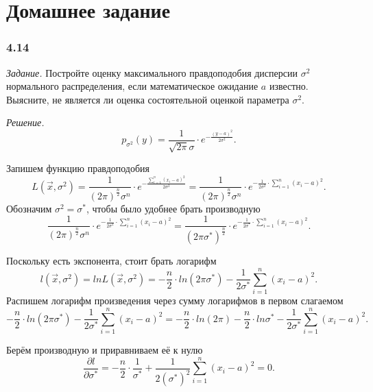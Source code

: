 \section*{Домашнее задание}

\subsubsection*{4.14}

\textit{Задание.}
Постройте оценку максимального правдоподобия дисперсии $ \sigma^2$ нормального распределения,
если математическое ожидание $a$ известно.
Выясните, не является ли оценка состоятельной оценкой параметра $ \sigma^2$.

\textit{Решение.}
$$p_{ \sigma^2} \left( y \right) =
  \frac{1}{ \sqrt{2 \pi } \sigma } \cdot e^{- \frac{ \left( y - a \right)^2}{2 \sigma^2}}.$$

Запишем функцию правдоподобия
$$L \left( \vec{x}, \sigma^2 \right) =
  \frac{1}{ \left( 2 \pi \right)^{ \frac{n}{2}} \sigma^n} \cdot
  e^{- \frac{ \sum \limits_{i = 1}^n \left( x_i - a \right)^2}{2 \sigma^2}} =
  \frac{1}{ \left( 2 \pi \right)^{ \frac{n}{2}} \sigma^n} \cdot
  e^{- \frac{1}{2 \sigma^2} \cdot \sum \limits_{i = 1}^n \left( x_i - a \right)^2}.$$
Обозначим $ \sigma^2 = \sigma^*$, чтобы было удобнее брать производную
$$ \frac{1}{ \left( 2 \pi \right)^{ \frac{n}{2}} \sigma^n} \cdot
  e^{- \frac{1}{2 \sigma^2} \cdot \sum \limits_{i = 1}^n \left( x_i - a \right)^2} =
  \frac{1}{ \left( 2 \pi \sigma^* \right)^{ \frac{n}{2}}} \cdot
  e^{- \frac{1}{2 \sigma^*} \cdot \sum \limits_{i = 1}^n \left( x_i - a \right)^2}.$$

Поскольку есть экспонента, стоит брать логарифм
$$l \left( \vec{x}, \sigma^2 \right) =
  ln L \left( \vec{x}, \sigma^2 \right) =
  - \frac{n}{2} \cdot ln \left( 2 \pi \sigma^* \right) -
  \frac{1}{2 \sigma^*} \sum \limits_{i = 1}^n \left( x_i - a \right)^2.$$
Распишем логарифм произведения через сумму логарифмов в первом слагаемом
$$- \frac{n}{2} \cdot ln \left( 2 \pi \sigma^* \right) -
  \frac{1}{2 \sigma^*} \sum \limits_{i = 1}^n \left( x_i - a \right)^2 =
  - \frac{n}{2} \cdot ln \left( 2 \pi \right) -
  \frac{n}{2} \cdot ln \sigma^* -
  \frac{1}{2 \sigma^*} \sum \limits_{i = 1}^n \left( x_i - a \right)^2.$$

Берём производную и приравниваем её к нулю
$$ \frac{ \partial l}{ \partial \sigma^*} =
  - \frac{n}{2} \cdot \frac{1}{ \sigma^*} +
  \frac{1}{2 \left( \sigma^* \right)^2} \sum \limits_{i = 1}^n \left( x_i - a \right)^2 =
  0.$$

